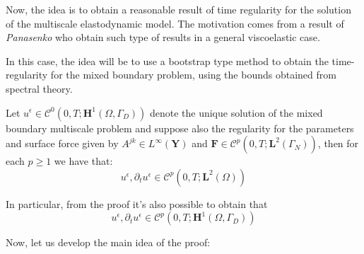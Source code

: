 
Now, the idea is to obtain a reasonable result of time regularity for the solution of the multiscale elastodynamic model. The motivation comes from a result of \textit{Panasenko} who obtain such type of results in a general viscoelastic case.

In this case, the idea will be to use a bootstrap type method to obtain the time-regularity for the mixed boundary problem, using the bounds obtained from spectral theory.

\begin{prop}
Let $u^{\epsilon} \in \mathcal{C}^{0}(0,T; \mathbf{H}^1(\Omega, \Gamma_D))$ denote the unique solution of the mixed boundary multiscale problem and suppose also the regularity for the parameters and surface force given by $A^{jk} \in L^{\infty}(\mathbf{Y})$ and $\mathbf{F} \in \mathcal{C}^p(0,T; \mathbf{L}^{2}(\Gamma_N))$, then for each $p \geq 1$ we have that:
\begin{equation*}
    u^{\epsilon}, \partial_t u^{\epsilon} \in \mathcal{C}^p(0,T; \mathbf{L}^2(\Omega))
\end{equation*}
\end{prop}
\begin{rem}
In particular, from the proof it's also possible to obtain that
\begin{equation*}
    u^{\epsilon}, \partial_t u^{\epsilon} \in \mathcal{C}^p(0,T; \mathbf{H}^1(\Omega, \Gamma_D))
\end{equation*}
\end{rem}
Now, let us develop the main idea of the proof:\\
